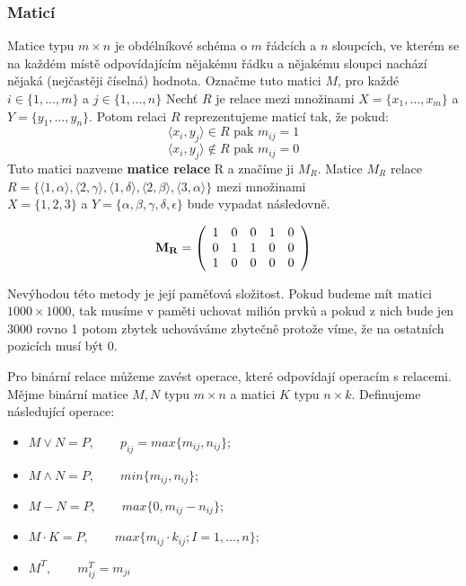 \documentclass[12pt,a4paper]{article}
\begin{document}
\subsubsection{Maticí}
Matice typu $m \times n$ je obdélníkové schéma o $m$ řádcích a $n$ sloupcích, ve kterém se na každém místě odpovídajícím nějakému řádku a nějakému sloupci nachází nějaká (nejčastěji číselná) hodnota. Označme tuto matici $M$, pro každé $i \in \{1, \dots,m\}$ a $j \in \{1,\dots,n\}$  Nechť $R$ je relace mezi množinami $X = \{x_1,\dots,x_m\}$ a $Y = \{y_1, \dots, y_n\}$. Potom relaci $R$ reprezentujeme maticí tak, že pokud:
$$\langle x_i,y_j\rangle \in R \text{ pak } m_{ij} = 1$$ 
$$\langle x_i,y_j\rangle \not\in R \text{ pak } m_{ij} = 0$$ 
Tuto matici nazveme \textbf{matice relace} R a značíme ji $M_R$. Matice $M_R$ relace $R = \{ \langle 1, \alpha \rangle, \langle 2, \gamma \rangle, \langle 1, \delta \rangle, \langle 2, \beta \rangle, \langle 3, \alpha \rangle\}$ mezi množinami \\$X = \{1,2,3\}$ a $Y = \{\alpha, \beta, \gamma, \delta, \epsilon\}$ bude vypadat  následovně.

\begin{displaymath}
{\bf M_R} =
\left( \begin{array}{ccccc}
1 & 0 & 0 & 1 & 0 \\
0 & 1 & 1 & 0 & 0 \\
1 & 0 & 0 & 0 & 0 \\
\end{array} \right)
\end{displaymath}

Nevýhodou této metody je její paměťová složitost. Pokud budeme mít matici $1000 \times 1000$, tak musíme v paměti uchovat milión prvků a pokud z nich bude jen 3000 rovno 1 potom zbytek uchováváme zbytečně protože víme, že na ostatních pozicích musí být 0.

Pro binární relace můžeme zavést operace, které odpovídají operacím s relacemi. Mějme binární matice $M,N$ typu $m \times n$ a matici $K$ typu $n \times k$. Definujeme následující operace:
\begin{itemize}
	\item[] $M \vee N = P, \qquad p_{ij} = max\{m_{ij}, n_{ij}\};$
	\item[] $M \wedge N = P, \qquad min\{m_{ij}, n_{ij}\};$
	\item[] $M - N = P, \qquad max\{0, m_{ij} - n_{ij}\};$
	\item[] $M \cdot K = P, \qquad max\{m_{ij} \cdot k_{ij}; I = 1, \dots ,n\};$
	\item[] $M^T, \qquad m^T_{ij} = m_{ji}$
\end{itemize}
\end{document}
